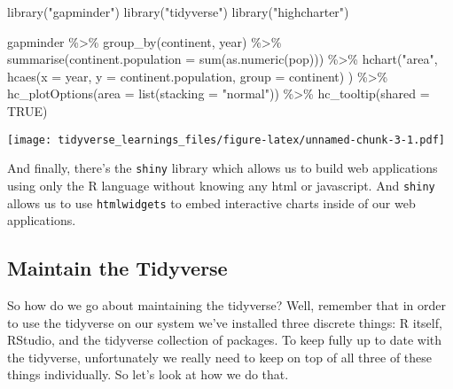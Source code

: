 \documentclass[
]{article}
\newenvironment{Shaded}{\begin{snugshade}}{\end{snugshade}}
\newcommand{\AttributeTok}[1]{\textcolor[rgb]{0.77,0.63,0.00}{#1}}
\newcommand{\ConstantTok}[1]{\textcolor[rgb]{0.00,0.00,0.00}{#1}}
\newcommand{\FunctionTok}[1]{\textcolor[rgb]{0.00,0.00,0.00}{#1}}
\newcommand{\NormalTok}[1]{#1}
\newcommand{\SpecialCharTok}[1]{\textcolor[rgb]{0.00,0.00,0.00}{#1}}
\newcommand{\StringTok}[1]{\textcolor[rgb]{0.31,0.60,0.02}{#1}}
\begin{document}
\begin{Shaded}
\begin{Highlighting}[]
\FunctionTok{library}\NormalTok{(}\StringTok{"gapminder"}\NormalTok{)}
\FunctionTok{library}\NormalTok{(}\StringTok{"tidyverse"}\NormalTok{)}
\FunctionTok{library}\NormalTok{(}\StringTok{"highcharter"}\NormalTok{)}

\NormalTok{gapminder }\SpecialCharTok{\%\textgreater{}\%}
  \FunctionTok{group\_by}\NormalTok{(continent, year) }\SpecialCharTok{\%\textgreater{}\%}
  \FunctionTok{summarise}\NormalTok{(}\AttributeTok{continent.population =} \FunctionTok{sum}\NormalTok{(}\FunctionTok{as.numeric}\NormalTok{(pop))) }\SpecialCharTok{\%\textgreater{}\%}
  \FunctionTok{hchart}\NormalTok{(}\StringTok{"area"}\NormalTok{,}
         \FunctionTok{hcaes}\NormalTok{(}\AttributeTok{x =}\NormalTok{ year, }
               \AttributeTok{y =}\NormalTok{ continent.population, }
               \AttributeTok{group =}\NormalTok{ continent)}
\NormalTok{         ) }\SpecialCharTok{\%\textgreater{}\%}
  \FunctionTok{hc\_plotOptions}\NormalTok{(}\AttributeTok{area =} \FunctionTok{list}\NormalTok{(}\AttributeTok{stacking =} \StringTok{"normal"}\NormalTok{)) }\SpecialCharTok{\%\textgreater{}\%}
  \FunctionTok{hc\_tooltip}\NormalTok{(}\AttributeTok{shared =} \ConstantTok{TRUE}\NormalTok{)}
\end{Highlighting}
\end{Shaded}

\texttt{[image: tidyverse\_learnings\_files/figure-latex/unnamed-chunk-3-1.pdf]}

And finally, there's the \texttt{shiny} library which allows us to build web applications using only the R language without knowing any html or javascript. And \texttt{shiny} allows us to use \texttt{htmlwidgets} to embed interactive charts inside of our web applications.

\hypertarget{maintain-the-tidyverse}{%
\subsection{Maintain the Tidyverse}\label{maintain-the-tidyverse}}

So how do we go about maintaining the tidyverse? Well, remember that in order to use the tidyverse on our system we've installed three discrete things: R itself, RStudio, and the tidyverse collection of packages. To keep fully up to date with the tidyverse, unfortunately we really need to keep on top of all three of these things individually. So let's look at how we do that.
\end{document}
